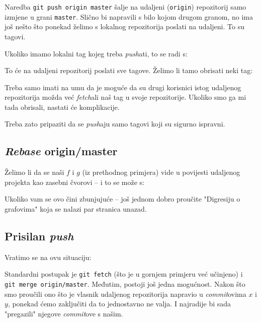 Naredba \verb+git push origin master+ šalje na udaljeni (\verb+origin+) repozitorij samo izmjene u grani \verb+master+.
Slično bi napravili s bilo kojom drugom granom, no ima još nešto što ponekad želimo s lokalnog repozitorija poslati na udaljeni.
To su tagovi.

Ukoliko imamo lokalni tag kojeg treba \emph{push}ati, to se radi s:


To će na udaljeni repozitorij poslati sve tagove.
Želimo li tamo obrisati neki tag:


Treba samo imati na umu da je moguće da su drugi korisnici istog udaljenog repozitorija možda već \emph{fetch}ali naš tag u svoje repozitorije.
Ukoliko smo ga mi tada obrisali, nastati će komplikacije.

Treba zato pripaziti da se \emph{push}aju samo tagovi koji su sigurno ispravni.

\subsection*{\emph{Rebase} origin/master}

Želimo li da se naši $f$ i $g$ (iz prethodnog primjera) vide u povijesti udaljenog projekta kao zasebni čvorovi -- i to se može s:


Ukoliko vam se ovo čini zbunjujuće -- još jednom dobro proučite "Digresiju o grafovima" koja se nalazi par stranica unazad.

\subsection*{Prisilan \emph{push}}

Vratimo se na ovu situaciju:



Standardni postupak je \verb+git fetch+ (što je u gornjem primjeru već učinjeno) i \\ \verb+git merge origin/master+.
Međutim, postoji još jedna mogućnost.
Nakon što smo proučili ono što je vlasnik udaljenog repozitorija napravio u \emph{commit}ovima $x$ i $y$, ponekad ćemo zaključiti da to jednostavno ne valja. 
I najradije bi sada "pregazili" njegove \emph{commit}ove s našim.

